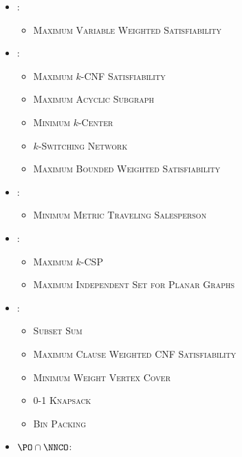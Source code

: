 \documentclass{article}
\begin{document}
\begin{itemize}
\item \NNCO:
  \begin{itemize}
  \item \textsc{Maximum Variable Weighted Satisfiability} \cite[Theorem~3.1]{om87} \cite[Theorem~8.3]{acgkmp99}
  \end{itemize}
\item \ApxNCO:
  \begin{itemize}
  \item \textsc{Maximum $k$-CNF Satisfiability} \cite[Theorem~8.6]{acgkmp99}
  \item \textsc{Maximum Acyclic Subgraph} \cite[Section~7.4]{dsst97}
  \item \textsc{Minimum $k$-Center} \cite[Section~7.4]{dsst97}
  \item \textsc{$k$-Switching Network} \cite[Section~7.4]{dsst97}
  \item \textsc{Maximum Bounded Weighted Satisfiability} \cite[Theorem~4]{sx95}
  \end{itemize}
\item \RNCAS:
  \begin{itemize}
  \item \textsc{Minimum Metric Traveling Salesperson} \cite[Theorem~7.1.1]{dsst97}
  \end{itemize}
\item \NCAS:
  \begin{itemize}
  \item \textsc{Maximum $k$-CSP} \cite[Corollary~13]{trevisan98}
  \item \textsc{Maximum Independent Set for Planar Graphs} \cite[Theorem 6.4.1]{dsst97}
  \end{itemize}
\item \FNCAS:
  \begin{itemize}
  \item \textsc{Subset Sum} \cite[Theorem~4.1.4]{dsst97}
  \item \textsc{Maximum Clause Weighted CNF Satisfiability} \cite[Theorem~8]{trevisan98}
  \item \textsc{Minimum Weight Vertex Cover} \cite[Theorem~5.3.6]{dsst97}
  \item \textsc{0-1 Knapsack} \cite[Theorem~2]{mayr88}
  \item \textsc{Bin Packing} \cite[Theorem~3]{mayr88}
  \end{itemize}
\item $\PO \cap \NNCO$:
  \begin{itemize}

\end{itemize}
\end{itemize}
\end{document}
